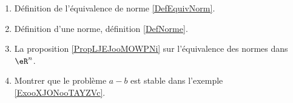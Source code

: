 
    \begin{enumerate}
        \item
            Définition de l'équivalence de norme \ref{DefEquivNorm}.
        \item
            Définition d'une norme, définition \ref{DefNorme}.
\item
    La proposition \ref{PropLJEJooMOWPNi} sur l'équivalence des normes dans \( \eR^n\).
\item
    Montrer que le problème \( a-b\) est stable dans l'exemple \ref{ExooXJONooTAYZVc}.
\end{enumerate}

